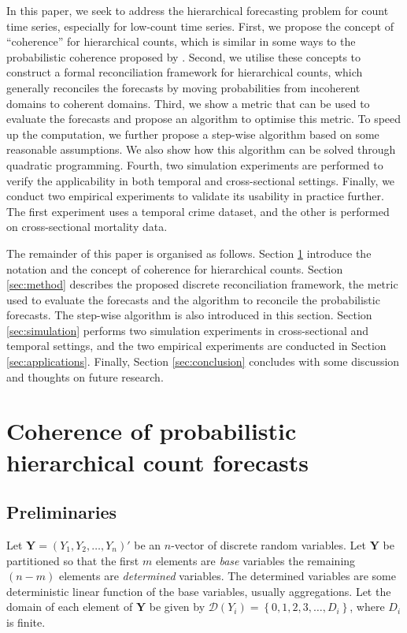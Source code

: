 \documentclass[a4paper,review,12pt,authoryear]{elsarticle}
\newcommand{\bY}{\mathbf{Y}}
\begin{document}
In this paper, we seek to address the hierarchical forecasting problem for count time series, especially for low-count time series.
First, we propose the concept of ``coherence'' for hierarchical counts, 
which is similar in some ways to the probabilistic coherence proposed by \cite{panagiotelisProbabilisticForecastReconciliation2022}.
Second, we utilise these concepts to construct a formal reconciliation framework for hierarchical counts, which generally reconciles the forecasts by moving probabilities from incoherent domains to coherent domains.
Third, we show a metric that can be used to evaluate the forecasts and propose an algorithm to optimise this metric. 
To speed up the computation, we further propose a step-wise algorithm based on some reasonable assumptions.
We also show how this algorithm can be solved through quadratic programming.
Fourth, two simulation experiments are performed to verify the applicability 
in both temporal and cross-sectional settings.
Finally, we conduct two empirical experiments to validate its usability in practice further. The first experiment uses a temporal crime dataset, and the other is performed on cross-sectional mortality data.

The remainder of this paper is organised as follows. 
Section \ref{sec:coherence} introduce the notation and the concept of coherence for hierarchical counts.
Section \ref{sec:method} describes the proposed discrete reconciliation framework, the metric used to evaluate the forecasts and the algorithm to reconcile the probabilistic forecasts. 
The step-wise algorithm is also introduced in this section.
Section \ref{sec:simulation} performs two simulation experiments in cross-sectional and temporal settings, and the two empirical experiments are conducted in Section \ref{sec:applications}. Finally, Section \ref{sec:conclusion} concludes with some discussion and thoughts on future research.



\section{Coherence of probabilistic hierarchical count forecasts}

\label{sec:coherence}

	\subsection{Preliminaries}
	Let $\bY=\left(Y_1,Y_2,\ldots,Y_n\right)'$ be an $n$-vector of discrete random variables.
  Let $\bY$ be partitioned so that the first $m$ elements are \textit{base} variables the remaining $(n-m)$ elements are \textit{determined} variables.
  The determined variables are some deterministic linear function of the base variables, usually aggregations. 
  Let the domain of each element of $\bY$ be given by $\mathcal{D}(Y_i)=\left\{0, 1,2,3,\dots,D_i\right\}$, where $D_i$ is finite.
	
\end{document}
